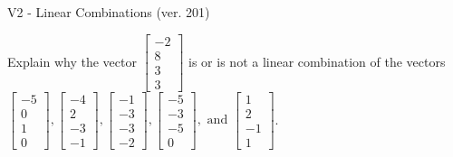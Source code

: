 \begin{exercise}
  \begin{exerciseTitle}V2 - Linear Combinations (ver. 201)\end{exerciseTitle}
  \begin{exerciseStatement}
    Explain why the vector \(\left[\begin{array}{c}
-2 \\
8 \\
3 \\
3
\end{array}\right]\)  is or is not a linear 
	combination of the vectors \(\left[\begin{array}{c}
-5 \\
0 \\
1 \\
0
\end{array}\right] , \left[\begin{array}{c}
-4 \\
2 \\
-3 \\
-1
\end{array}\right] , \left[\begin{array}{c}
-1 \\
-3 \\
-3 \\
-2
\end{array}\right] , \left[\begin{array}{c}
-5 \\
-3 \\
-5 \\
0
\end{array}\right] , \text{ and } \left[\begin{array}{c}
1 \\
2 \\
-1 \\
1
\end{array}\right]\).
	



\end{exerciseStatement}
\end{exercise}
